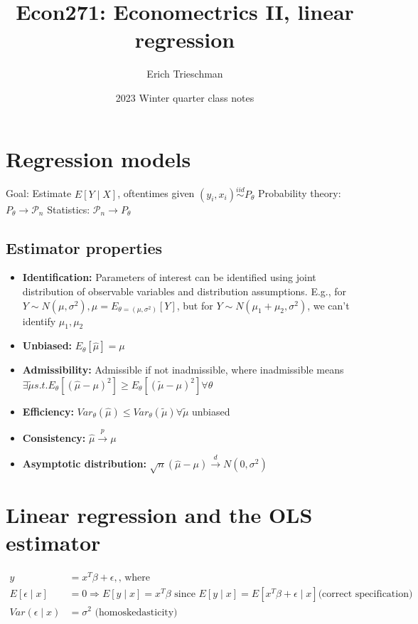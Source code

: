 \documentclass{article}
\title{Econ271: Economectrics II, linear regression}
\author{Erich Trieschman}
\date{2023 Winter quarter class notes}
\begin{document}
\maketitle


\section{Regression models}
Goal: Estimate $E[Y \mid X]$, oftentimes given $(y_i, x_i) \overset{iid}{\sim} P_\theta$
Probability theory: $P_\theta \rightarrow \mathcal{P}_n$
Statistics: $\mathcal{P}_n \rightarrow P_\theta$
\subsection{Estimator properties}
\begin{itemize}
  \item \textbf{Identification:} Parameters of interest can be identified using joint distribution of observable variables and distribution assumptions. E.g., for $Y \sim N(\mu, \sigma^2), \mu = E_{\theta = (\mu, \sigma^2)}[Y]$, but for $Y \sim N(\mu_1 + \mu_2, \sigma^2)$, we can't identify $\mu_1, \mu_2$
  \item \textbf{Unbiased:} $E_\theta[\hat{\mu}] = \mu$
  \item \textbf{Admissibility:} Admissible if not inadmissible, where inadmissible means $\exists \tilde{\mu} s.t. E_\theta[(\hat{\mu} - \mu)^2] \geq E_\theta[(\tilde{\mu} - \mu)^2] \forall \theta$
  \item \textbf{Efficiency:} $Var_\theta(\hat{\mu}) \leq Var_\theta(\tilde{\mu}) \forall \tilde{\mu}$ unbiased
  \item \textbf{Consistency:} $\hat{\mu} \overset{p}{\longrightarrow} \mu$
  \item \textbf{Asymptotic distribution:} $\sqrt{n}(\hat{\mu} - \mu) \overset{d}{\longrightarrow} N(0, \sigma^2)$
\end{itemize}

\section{Linear regression and the OLS estimator}
\begin{align*}
  y &= x^T\beta + \epsilon, \textrm{, where }\\
  E[\epsilon \mid x] &= 0 \Longrightarrow E[y \mid x] = x^T\beta \textrm{ since } E[y \mid x] = E[x^T\beta + \epsilon \mid x] \textrm{(correct specification)}\\
  Var(\epsilon \mid x) &= \sigma^2 \textrm{ (homoskedasticity)}
\end{align*}
\end{document}
